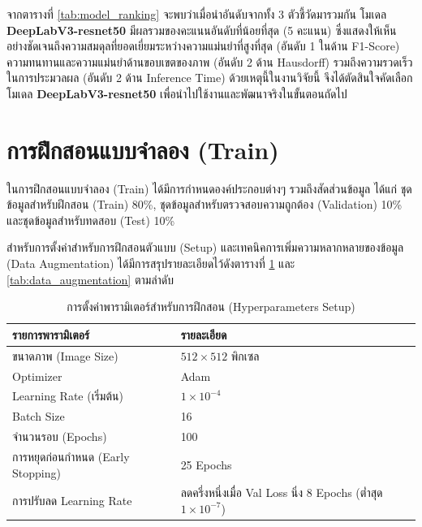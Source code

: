 จากตารางที่ \ref{tab:model_ranking} จะพบว่าเมื่อนำอันดับจากทั้ง 3 ตัวชี้วัดมารวมกัน โมเดล \textbf{DeepLabV3-resnet50} มีผลรวมของคะแนนอันดับที่น้อยที่สุด (5 คะแนน) ซึ่งแสดงให้เห็นอย่างชัดเจนถึงความสมดุลที่ยอดเยี่ยมระหว่างความแม่นยำที่สูงที่สุด (อันดับ 1 ในด้าน F1-Score) ความทนทานและความแม่นยำด้านขอบเขตของภาพ (อันดับ 2 ด้าน Hausdorff) รวมถึงความรวดเร็วในการประมวลผล (อันดับ 2 ด้าน Inference Time) ด้วยเหตุนี้ในงานวิจัยนี้ จึงได้ตัดสินใจคัดเลือกโมเดล \textbf{DeepLabV3-resnet50} เพื่อนำไปใช้งานและพัฒนาจริงในขั้นตอนถัดไป

\section{การฝึกสอนแบบจำลอง (Train)}

ในการฝึกสอนแบบจำลอง (Train) ได้มีการกำหนดองค์ประกอบต่างๆ รวมถึงสัดส่วนข้อมูล ได้แก่ ชุดข้อมูลสำหรับฝึกสอน (Train) 80\%, ชุดข้อมูลสำหรับตรวจสอบความถูกต้อง (Validation) 10\% และชุดข้อมูลสำหรับทดสอบ (Test) 10\% 

สำหรับการตั้งค่าสำหรับการฝึกสอนตัวแบบ (Setup) และเทคนิคการเพิ่มความหลากหลายของข้อมูล (Data Augmentation) ได้มีการสรุปรายละเอียดไว้ดังตารางที่ \ref{tab:train_setup} และ \ref{tab:data_augmentation} ตามลำดับ

\begin{table}[hbt!]
\centering
\caption{การตั้งค่าพารามิเตอร์สำหรับการฝึกสอน (Hyperparameters Setup)}
\label{tab:train_setup}
\begin{tabular}{|l|l|}
\hline
\textbf{รายการพารามิเตอร์} & \textbf{รายละเอียด} \\
\hline
ขนาดภาพ (Image Size) & $512 \times 512$ พิกเซล \\
Optimizer & Adam \\
Learning Rate (เริ่มต้น) & $1 \times 10^{-4}$ \\
Batch Size & 16 \\
จำนวนรอบ (Epochs) & 100 \\
การหยุดก่อนกำหนด (Early Stopping) & 25 Epochs \\
การปรับลด Learning Rate & ลดครึ่งหนึ่งเมื่อ Val Loss นิ่ง 8 Epochs (ต่ำสุด $1 \times 10^{-7}$) \\
\hline
\end{tabular}
\end{table}

